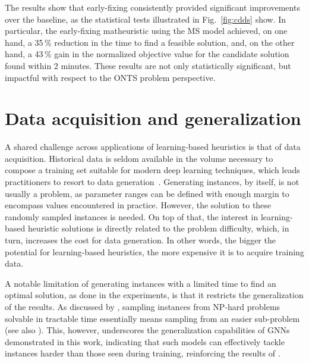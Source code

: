 The results show that early-fixing consistently provided significant improvements over the baseline, as the statistical tests illustrated in Fig.~\ref{fig:cdds} show.
In particular, the early-fixing matheuristic using the MS model achieved, on one hand, a 35\,\% reduction in the time to find a feasible solution, and, on the other hand, a 43\,\% gain in the normalized objective value for the candidate solution found within 2 minutes.
These results are not only statistically significant, but impactful with respect to the ONTS problem perspective.

\section{Data acquisition and generalization}

A shared challenge across applications of learning-based heuristics is that of data acquisition.
Historical data is seldom available in the volume necessary to compose a training set suitable for modern deep learning techniques, which leads practitioners to resort to data generation~\cite{bengioMachineLearningCombinatorial2021}.
Generating instances, by itself, is not usually a problem, as parameter ranges can be defined with enough margin to encompass values encountered in practice.
However, the solution to these randomly sampled instances is needed.
On top of that, the interest in learning-based heuristic solutions is directly related to the problem difficulty, which, in turn, increases the cost for data generation.
In other words, the bigger the potential for learning-based heuristics, the more expensive it is to acquire training data.

A notable limitation of generating instances with a limited time to find an optimal solution, as done in the experiments, is that it restricts the generalization of the results.
As discussed by , sampling instances from NP-hard problems solvable in tractable time essentially means sampling from an easier sub-problem (see also ).
This, however, underscores the generalization capabilities of GNNs demonstrated in this work, indicating that such models can effectively tackle instances harder than those seen during training, reinforcing the results of .

